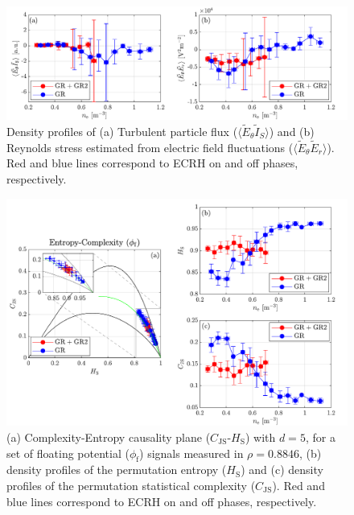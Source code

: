 \documentclass[preprint,12pt,authoryear]{elsarticle}
\begin{document}
\begin{figure}[!ht]

   \includegraphics[width=1.0\columnwidth]{Images/transition_2.pdf}
   \caption{Density profiles of (a) Turbulent particle flux ($\langle \tilde{E}_{\theta} \tilde{I}_{S}\rangle$) and (b) Reynolds stress estimated from 
   electric field fluctuations ($\langle \tilde{E}_{\theta} \tilde{E}_{r}\rangle$). Red and blue lines correspond to ECRH on and off phases, respectively.}
   \label{Fig:transition_2}
\end{figure}
\begin{figure}[!ht]

   \includegraphics[width=1.0\columnwidth]{Images/transition_3.pdf}
   \caption{(a) Complexity-Entropy causality plane ($C_\mathrm{JS}$-$H_\mathrm{S}$) with $d=5$, for a set of floating potential ($\phi_\mathrm{f}$) signals measured in $\rho=0.8846$,  
   (b) density profiles of the permutation entropy ($H_\mathrm{S}$) and (c) density profiles of the permutation statistical complexity ($C_\mathrm{JS}$).
    Red and blue lines correspond to ECRH on and off phases, respectively.}
   \label{Fig:transition_3}
\end{figure}
\end{document}
